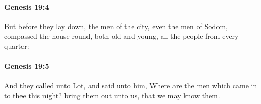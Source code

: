 		\paragraph{Genesis 19:4} %
			\label{GENESIS-19-4}

			But before they lay down, the men of the city, even the men of Sodom, compassed the house round, both old and young, all the people from every quarter:


		\paragraph{Genesis 19:5} %
			\label{GENESIS-19-5}

			And they called unto Lot, and said unto him, Where are the men which came in to thee this night? bring them out unto us, that we may know them.


